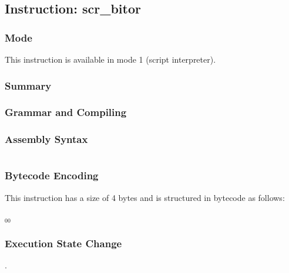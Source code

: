 \subsection{Instruction: scr\_bitor}

\subsubsection{Mode}
This instruction is available in mode 1 (script interpreter).
\subsubsection{Summary}


\subsubsection{Grammar and Compiling}


\subsubsection{Assembly Syntax}

\begin{myquote}
\begin{verbatim}

\end{verbatim}
\end{myquote}

\subsubsection{Bytecode Encoding}

This instruction has a size of 4 bytes and is structured in bytecode as follows:

$_{00}$\ 

\subsubsection{Execution State Change}

.


